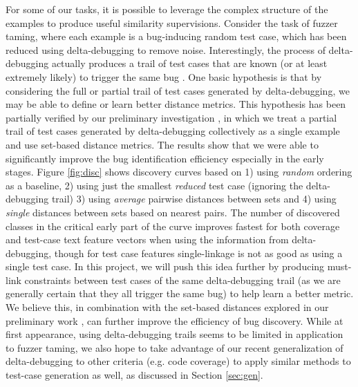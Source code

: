 For some of our tasks, it is possible to leverage the complex
structure of the examples to produce useful similarity
supervisions. Consider the task of fuzzer taming, where each example
is a bug-inducing random test case, which has been reduced using
delta-debugging \cite{DD} to remove noise.  Interestingly, the process
of delta-debugging actually produces a trail of test cases that are
known (or at least extremely likely) to trigger the same bug
\cite{PLDI13}. One basic hypothesis is that by considering the full or
partial trail of test cases generated by delta-debugging, we may be
able to define or learn better distance metrics. This hypothesis has
been partially verified by our preliminary investigation
\cite{DDTrail}, in which we treat a partial trail of test cases
generated by delta-debugging collectively as a single example and use
set-based distance metrics. The results show that we were able to
significantly improve the bug identification efficiency especially in
the early stages. Figure \ref{fig:disc} shows discovery curves based
on 1) using \emph{random} ordering as a baseline, 2) using just the
smallest \emph{reduced} test case (ignoring the delta-debugging trail)
3) using \emph{average} pairwise distances between sets and 4) using
\emph{single} distances between sets based on nearest pairs.  The
number of discovered classes in the critical early part of the curve
improves fastest for both coverage and test-case text feature vectors
when using the information from delta-debugging, though for test case
features single-linkage is not as good as using a single test case.
In this project, we will push this idea further by producing must-link
constraints between test cases of the same delta-debugging trail (as
we are generally certain that they all trigger the same bug) to help
learn a better metric. We believe this, in combination with the
set-based distances explored in our preliminary work \cite{DDTrail},
can further improve the efficiency of bug discovery.  While at first
appearance, using delta-debugging trails seems to be limited in
application to fuzzer taming, we also hope to take advantage of our
recent generalization of delta-debugging to other criteria (e.g. code
coverage) \cite{icst2014} to apply similar methods to test-case
generation as well, as discussed in Section \ref{sec:gen}.

